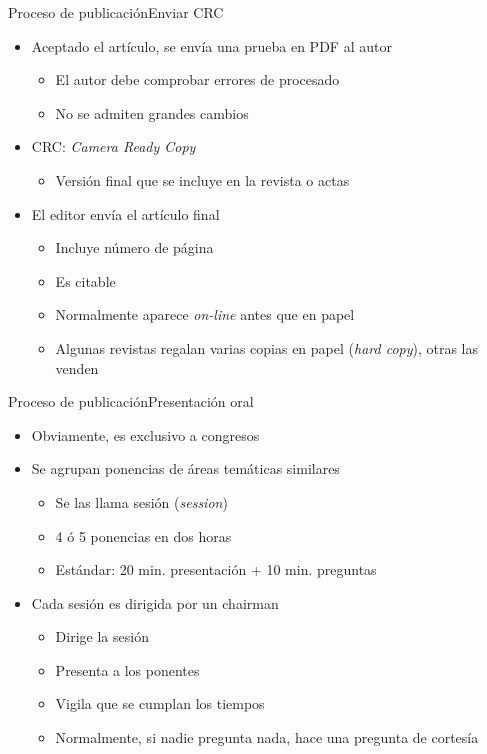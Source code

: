 \documentclass{beamer}
\begin{document}
\begin{frame}{Proceso de publicación}{Enviar CRC}
  	\begin{itemize}
		\item Aceptado el artículo, se envía una prueba en PDF al autor
			\begin{itemize}
			\item El autor debe comprobar errores de procesado
			\item No se admiten grandes cambios
			\end{itemize}
		\item CRC: \textit{Camera Ready Copy}
		\begin{itemize}
			\item Versión final que se incluye en la revista o actas
		\end{itemize}
		\item El editor envía el artículo final
		\begin{itemize}
			\item Incluye número de página
			\item Es citable
			\item Normalmente aparece \textit{on-line} antes que en papel
			\item Algunas revistas regalan varias copias en papel (\textit{hard copy}), otras las venden
		\end{itemize}
	\end{itemize}

\end{frame}

\begin{frame}{Proceso de publicación}{Presentación oral}
  	\begin{itemize}
		\item Obviamente, es exclusivo a congresos
		\item Se agrupan ponencias de áreas temáticas similares
			\begin{itemize}
			\item Se las llama \alert{sesión} (\textit{session})
			\item 4 ó 5 ponencias en dos horas
			\item Estándar: 20 min. presentación + 10 min. preguntas
			\end{itemize}
		\item Cada sesión es dirigida por un \alert{chairman}
			\begin{itemize}
			\item Dirige la sesión
			\item Presenta a los ponentes
			\item Vigila que se cumplan los tiempos
			\item Normalmente, si nadie pregunta nada, hace una pregunta de cortesía
			\end{itemize}
	\end{itemize}

\end{frame}
\end{document}
